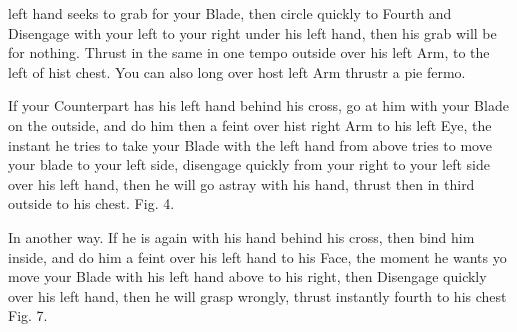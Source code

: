 \newpage


\newpage



left hand seeks to grab for your Blade, then circle quickly to Fourth and Disengage with your left to your right under his left hand, then his grab will be for nothing. Thrust in the same in one tempo outside over his left Arm, to the left of hist chest. You can also long over host left Arm thrustr a pie fermo.

\exercise{}

If your Counterpart has his left hand behind his cross, go at him with your Blade on the outside, and do him then a feint over hist right Arm to his left Eye, the instant he tries to take your Blade with the left hand from above tries to move your blade to your left side, disengage quickly from your right to your left side over his left hand, then he will go astray with his hand, thrust then in third outside to his chest. Fig. 4.

\exercise{}

In another way. If he is again with his hand behind his cross, then bind him inside, and do him a feint over his left hand to his Face, the moment he wants yo move your Blade with his left hand above to his right, then Disengage quickly over his left hand, then he will grasp wrongly, thrust instantly fourth to his chest Fig. 7.

